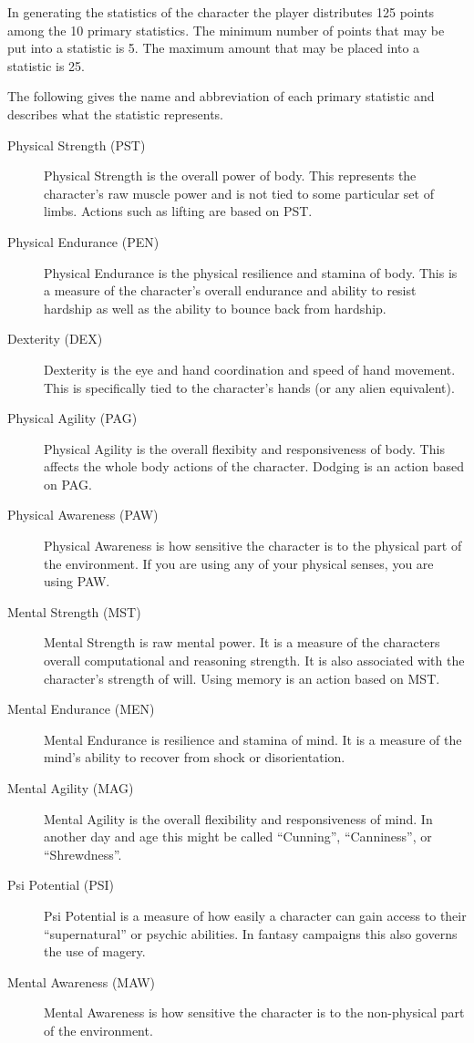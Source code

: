 In generating the statistics of the character the player distributes 
125 points among the 10 primary statistics. The minimum number of points that may be
put into a statistic is 5. The maximum amount that may be placed into
a statistic is 25.

The following gives the name and abbreviation of each primary statistic and
describes what the statistic represents.

\begin{description}
	\item[Physical Strength	(PST)]
	Physical Strength is the overall power of body. This represents
	the character's raw muscle power and is not tied to some particular
	set of limbs. Actions such as lifting are based on PST.
	\item[Physical Endurance (PEN)]
	Physical Endurance is the physical resilience and stamina of body.
	This is a measure of the character's overall endurance and ability
	to resist hardship as well as the ability to bounce back from hardship.
	\item[Dexterity	(DEX)]
	Dexterity is the eye and hand coordination and speed of hand movement.
	This is	specifically tied to the character's hands (or any alien 
	equivalent).
	\item[Physical Agility (PAG)]
	Physical Agility is the overall flexibity and responsiveness of body.
	This affects the whole body actions of the character. Dodging is 
	an action based on PAG.
	\item[Physical Awareness (PAW)]
	Physical Awareness is how sensitive the character is to
	the physical part of the environment. If you are using any of 
	your physical senses, you are using PAW.
	\item[Mental Strength (MST)]
	Mental Strength is raw mental power. It is a measure of the characters 
	overall computational and reasoning strength. It is also associated with
	the character's strength of will. Using memory is an action based 
	on MST.
	\item[Mental Endurance (MEN)]
	Mental Endurance is resilience and stamina of mind. It is a measure of the
	mind's ability to recover from shock or disorientation.
	\item[Mental Agility (MAG)]
	Mental Agility is the overall flexibility and responsiveness of mind.
	In another day and age this might be called ``Cunning'', 
	``Canniness'', or ``Shrewdness''.
	\item[Psi Potential (PSI)]
	Psi Potential is a measure of how easily a character can gain access to
	their ``supernatural'' or psychic abilities. In fantasy campaigns 
	this also governs the use of magery.
	\item[Mental Awareness (MAW)]
	Mental Awareness is how sensitive the character is to
	the non-physical part of the environment. 
\end{description}

